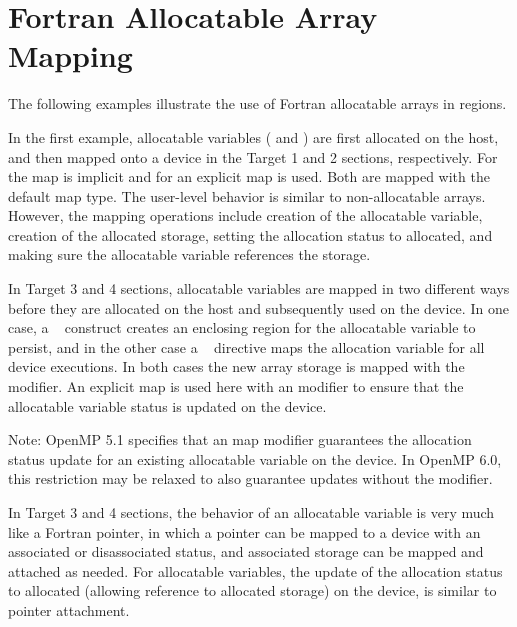 \pagebreak
\section{Fortran Allocatable Array Mapping}
\label{sec:fort_allocatable_array_mapping}


The following examples illustrate the use of Fortran allocatable arrays in  regions.

In the first example,  allocatable variables ( and ) are first allocated
on the host, and then mapped onto a device in the Target 1 and 2 sections, respectively.
For  the map is implicit and for  an explicit map is used.
Both are mapped with the default  map type.
The user-level behavior is similar to non-allocatable arrays.
However, the mapping operations include creation of the allocatable variable,
creation of the allocated storage, setting the allocation status to allocated,
and making sure the allocatable variable references the storage.

In Target 3 and 4 sections, allocatable variables are mapped in two
different ways before they are allocated on the host and subsequently used on the device.
In one case, a ~ construct creates an enclosing region for
the allocatable variable to persist, and in the other case a
~ directive maps the allocation variable for all device executions.
In both cases the new array storage is mapped  with the  modifier.
An explicit map is used here with an  modifier to ensure that the allocatable
variable status is updated on the device.

Note: OpenMP 5.1 specifies that an  map modifier guarantees the
allocation status update for an existing allocatable variable on the device.
In OpenMP 6.0, this restriction may be relaxed to also guarantee updates
without the  modifier.

In Target 3 and 4 sections, the behavior of an allocatable variable is very
much like a Fortran pointer, in which a pointer can be mapped to a device with an associated
or disassociated status, and associated storage can be mapped and attached as needed.
For allocatable variables, the update of the allocation status to allocated (allowing
reference to allocated storage) on the device, is similar to pointer attachment.



